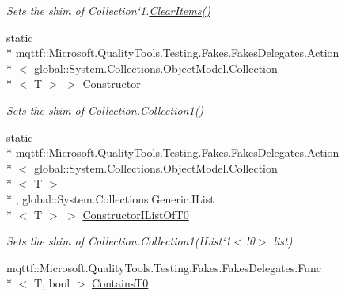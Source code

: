\begin{DoxyCompactItemize}
\begin{DoxyCompactList}\small\item\em Sets the shim of Collection`1.\hyperlink{class_system_1_1_collections_1_1_object_model_1_1_fakes_1_1_shim_collection_3_01_t_01_4_af7ac9785ca2aaef2bff673b7685920c5}{Clear\-Items()}\end{DoxyCompactList}\item 
static \\*
mqttf\-::\-Microsoft.\-Quality\-Tools.\-Testing.\-Fakes.\-Fakes\-Delegates.\-Action\\*
$<$ global\-::\-System.\-Collections.\-Object\-Model.\-Collection\\*
$<$ T $>$ $>$ \hyperlink{class_system_1_1_collections_1_1_object_model_1_1_fakes_1_1_shim_collection_3_01_t_01_4_a8b2fd033320b5062f5d5e78f2d19dd40}{Constructor}
\begin{DoxyCompactList}\small\item\em Sets the shim of Collection{.\-Collection}1()\end{DoxyCompactList}\item 
static \\*
mqttf\-::\-Microsoft.\-Quality\-Tools.\-Testing.\-Fakes.\-Fakes\-Delegates.\-Action\\*
$<$ global\-::\-System.\-Collections.\-Object\-Model.\-Collection\\*
$<$ T $>$\\*
, global\-::\-System.\-Collections.\-Generic.\-I\-List\\*
$<$ T $>$ $>$ \hyperlink{class_system_1_1_collections_1_1_object_model_1_1_fakes_1_1_shim_collection_3_01_t_01_4_aa83204ce51c4215a39adcf9ea0ca1868}{Constructor\-I\-List\-Of\-T0}
\begin{DoxyCompactList}\small\item\em Sets the shim of Collection{.\-Collection}1(I\-List`1$<$!0$>$ list)\end{DoxyCompactList}\item 
mqttf\-::\-Microsoft.\-Quality\-Tools.\-Testing.\-Fakes.\-Fakes\-Delegates.\-Func\\*
$<$ T, bool $>$ \hyperlink{class_system_1_1_collections_1_1_object_model_1_1_fakes_1_1_shim_collection_3_01_t_01_4_a3749c5ef7db585ec7a8f79ba413cd1cf}{Contains\-T0}

\end{DoxyCompactItemize}
